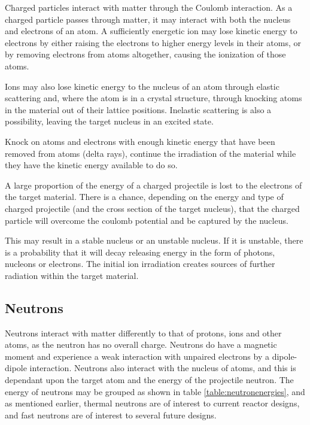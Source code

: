 Charged particles interact with matter through the Coulomb interaction.  As a charged particle passes through matter, it may interact with both the nucleus and electrons of an atom.  A sufficiently energetic ion may lose kinetic energy to electrons by either raising the electrons to higher energy levels in their atoms, or by removing electrons from atoms altogether, causing the ionization of those atoms.  

Ions may also lose kinetic energy to the nucleus of an atom through elastic scattering and, where the atom is in a crystal structure, through knocking atoms in the material out of their lattice positions.  Inelastic scattering is also a possibility, leaving the target nucleus in an excited state.

Knock on atoms and electrons with enough kinetic energy that have been removed from atoms (delta rays), continue the irradiation of the material while they have the kinetic energy available to do so.

A large proportion of the energy of a charged projectile is lost to the electrons of the target material.  There is a chance, depending on the energy and type of charged projectile (and the cross section of the target nucleus), that the charged particle will overcome the coulomb potential and be captured by the nucleus.

This may result in a stable nucleus or an unstable nucleus.  If it is unstable, there is a probability that it will decay releasing energy in the form of photons, nucleons or electrons.  The initial ion irradiation creates sources of further radiation within the target material.



\FloatBarrier
\subsection{Neutrons}


Neutrons interact with matter differently to that of protons, ions and other atoms, as the neutron has no overall charge.  Neutrons do have a magnetic moment and experience a weak interaction with unpaired electrons by a dipole-dipole interaction.  Neutrons also interact with the nucleus of atoms, and this is dependant upon the target atom and the energy of the projectile neutron.  The energy of neutrons may be grouped as shown in table \ref{table:neutronenergies}, and as mentioned earlier, thermal neutrons are of interest to current reactor designs, and fast neutrons are of interest to several future designs.
 
